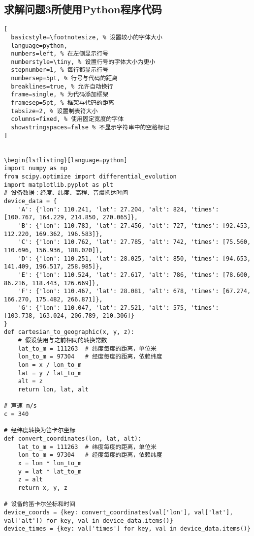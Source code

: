 \documentclass[withoutpreface,bwprint,12pt,a4paper]{cumcmthesis}
\begin{document}
\begin{appendices}
 \section{求解问题3所使用Python程序代码}

\begin{lstlisting}[
  basicstyle=\footnotesize, % 设置较小的字体大小
  language=python,
  numbers=left, % 在左侧显示行号
  numberstyle=\tiny, % 设置行号的字体大小为更小
  stepnumber=1, % 每行都显示行号
  numbersep=5pt, % 行号与代码的距离
  breaklines=true, % 允许自动换行
  frame=single, % 为代码添加框架
  framesep=5pt, % 框架与代码的距离
  tabsize=2, % 设置制表符大小
  columns=fixed, % 使用固定宽度的字体
  showstringspaces=false % 不显示字符串中的空格标记
]


\begin{lstlisting}[language=python]
import numpy as np
from scipy.optimize import differential_evolution
import matplotlib.pyplot as plt
# 设备数据：经度、纬度、高程、音爆抵达时间
device_data = {
    'A': {'lon': 110.241, 'lat': 27.204, 'alt': 824, 'times': [100.767, 164.229, 214.850, 270.065]},
    'B': {'lon': 110.783, 'lat': 27.456, 'alt': 727, 'times': [92.453, 112.220, 169.362, 196.583]},
    'C': {'lon': 110.762, 'lat': 27.785, 'alt': 742, 'times': [75.560, 110.696, 156.936, 188.020]},
    'D': {'lon': 110.251, 'lat': 28.025, 'alt': 850, 'times': [94.653, 141.409, 196.517, 258.985]},
    'E': {'lon': 110.524, 'lat': 27.617, 'alt': 786, 'times': [78.600, 86.216, 118.443, 126.669]},
    'F': {'lon': 110.467, 'lat': 28.081, 'alt': 678, 'times': [67.274, 166.270, 175.482, 266.871]},
    'G': {'lon': 110.047, 'lat': 27.521, 'alt': 575, 'times': [103.738, 163.024, 206.789, 210.306]}
}
def cartesian_to_geographic(x, y, z):
    # 假设使用与之前相同的转换常数
    lat_to_m = 111263  # 纬度每度的距离，单位米
    lon_to_m = 97304   # 经度每度的距离，依赖纬度
    lon = x / lon_to_m
    lat = y / lat_to_m
    alt = z
    return lon, lat, alt

# 声速 m/s
c = 340

# 经纬度转换为笛卡尔坐标
def convert_coordinates(lon, lat, alt):
    lat_to_m = 111263  # 纬度每度的距离，单位米
    lon_to_m = 97304   # 经度每度的距离，依赖纬度
    x = lon * lon_to_m
    y = lat * lat_to_m
    z = alt
    return x, y, z

# 设备的笛卡尔坐标和时间
device_coords = {key: convert_coordinates(val['lon'], val['lat'], val['alt']) for key, val in device_data.items()}
device_times = {key: val['times'] for key, val in device_data.items()}


\end{lstlisting}
\end{appendices}
\end{document}
